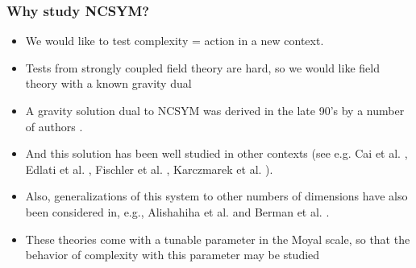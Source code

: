 \documentclass[8pt,aspectratio=169]{beamer}
\begin{document}
\begin{frame}
\frametitle{Why study NCSYM?}

\begin{itemize}

\item We would like to test complexity = action in a new context. 

\item Tests from strongly coupled field theory are hard, so we would like field theory with a known gravity dual

\item A gravity solution dual to NCSYM was derived in the late 90's by a number of authors \cite{Hashimoto:1999ut, Maldacena:1999mh}.

\item And this solution has been well studied in other contexts (see e.g. Cai et al. \cite{Cai:1999aw}, Edlati et al. \cite{Edalati:2012jj}, Fischler et al. \cite{Fischler:2013gsa}, Karczmarek et al. \cite{Karczmarek:2013xxa}).

\item Also, generalizations of this system to other numbers of dimensions have also been considered in, e.g., Alishahiha et al. \cite{Alishahiha:1999ci} and Berman et al. \cite{Berman:2000jw}.

\item These theories come with a tunable parameter in the Moyal scale, so that the behavior of complexity with this parameter may be studied

\end{itemize}

\end{frame}
\end{document}
